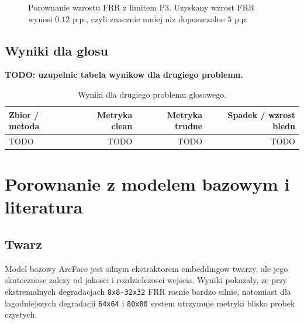 \documentclass[12pt]{article}
\begin{document}
\begin{figure}[ht]
    \centering
    \caption{Porownanie wzrostu FRR z limitem P3. Uzyskany wzrost FRR wynosi $0.12$ p.p., czyli znacznie mniej niz dopuszczalne $5$ p.p.}
    \label{fig:face_low_res_p3_delta}
\end{figure}

\subsection{Wyniki dla glosu}

\textbf{TODO: uzupelnic tabela wynikow dla drugiego problemu.}

\begin{table}[ht]
    \centering
    \begin{tabular}{lrrr}
        \toprule
        Zbior / metoda & Metryka clean & Metryka trudne & Spadek / wzrost bledu \\
        \midrule
        TODO & TODO & TODO & TODO \\
        \bottomrule
    \end{tabular}
    \caption{Wyniki dla drugiego problemu glosowego.}
    \label{tab:voice_results}
\end{table}

\section{Porownanie z modelem bazowym i literatura}

\subsection{Twarz}

Model bazowy ArcFace jest silnym ekstraktorem embeddingow twarzy, ale jego skutecznosc zalezy od jakosci i rozdzielczosci wejscia. Wyniki pokazaly, ze przy ekstremalnych degradacjach \texttt{8x8-32x32} FRR rosnie bardzo silnie, natomiast dla lagodniejszych degradacji \texttt{64x64} i \texttt{80x80} system utrzymuje metryki blisko probek czystych.
\end{document}
